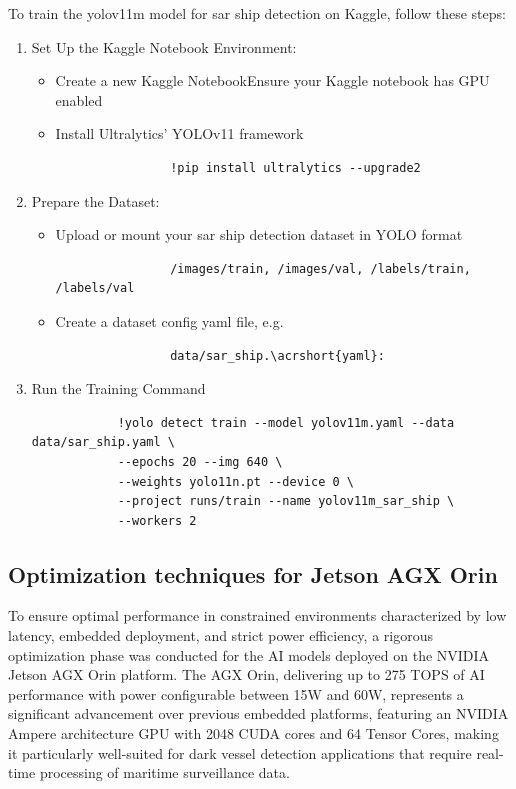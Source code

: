 \documentclass{article}
\begin{document}
	To train the \acrshort{yolov11m} model for \acrshort{sar} ship detection on Kaggle, follow these steps:
	\begin{enumerate}
		\item Set Up the Kaggle Notebook Environment:
		\begin{itemize}
			\item Create a new Kaggle NotebookEnsure your Kaggle notebook has GPU enabled
			\item Install Ultralytics' YOLOv11 framework
			\begin{lstlisting}
				!pip install ultralytics --upgrade2
			\end{lstlisting}
		\end{itemize}
		
		\item Prepare the Dataset:
		\begin{itemize}
			\item Upload or mount your \acrshort{sar} ship detection dataset in YOLO format
			\begin{lstlisting}
				/images/train, /images/val, /labels/train, /labels/val
			\end{lstlisting}
			\item Create a dataset config \acrshort{yaml} file, e.g. \begin{lstlisting}
				data/sar_ship.\acrshort{yaml}:
			\end{lstlisting}
		\end{itemize}
		
		\item Run the Training Command
		\begin{lstlisting}
			!yolo detect train --model yolov11m.yaml --data data/sar_ship.yaml \
			--epochs 20 --img 640 \
			--weights yolo11n.pt --device 0 \
			--project runs/train --name yolov11m_sar_ship \
			--workers 2
		\end{lstlisting}
	\end{enumerate}
	
	\subsection{Optimization techniques for Jetson AGX Orin}
	To ensure optimal performance in constrained environments characterized by low latency, embedded deployment, and strict power efficiency, a rigorous optimization phase was conducted for the AI models deployed on the NVIDIA Jetson AGX Orin platform. The AGX Orin, delivering up to 275 TOPS of AI performance with power configurable between 15W and 60W, represents a significant advancement over previous embedded platforms, featuring an NVIDIA Ampere architecture GPU with 2048 CUDA cores and 64 Tensor Cores, making it particularly well-suited for dark vessel detection applications that require real-time processing of maritime surveillance data.\\
	
\end{document}
